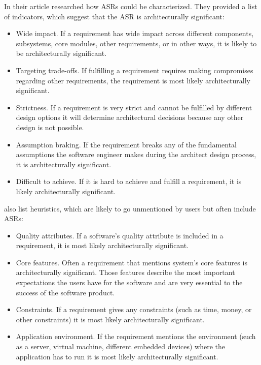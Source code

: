 In their article \textcite{chenCharacterizingArchitecturallySignificant2013} researched how ASRs could be characterized. They provided a list of indicators, which suggest that the ASR is architecturally significant:
\begin{itemize}
	\item Wide impact. If a requirement has wide impact across different components, subsystems, core modules, other requirements, or in other ways, it is likely to be architecturally significant.
	\item Targeting trade-offs. If fulfilling a requirement requires making compromises regarding other requirements, the requirement is most likely architecturally significant.
	\item Strictness. If a requirement is very strict and cannot be fulfilled by different design options it will determine architectural decisions because any other design is not possible.
	\item Assumption braking. If the requirement breaks any of the fundamental assumptions the software engineer makes during the architect design process, it is architecturally significant.
	\item Difficult to achieve. If it is hard to achieve and fulfill a requirement, it is likely architecturally significant.
\end{itemize}

\citeauthor{chenCharacterizingArchitecturallySignificant2013} also list heuristics, which are likely to go unmentioned by users but often include ASRs:

\begin{itemize}
	\item Quality attributes. If a software's quality attribute is included in a requirement, it is most likely architecturally significant.
	\item Core features. Often a requirement that mentions system's core features is architecturally significant. Those features describe the most important expectations the users have for the software and are very essential to the success of the software product.
	\item Constraints. If a requirement gives any constraints (such as time, money, or other constraints) it is most likely architecturally significant.
	\item Application environment. If the requirement mentions the environment (such as a server, virtual machine, different embedded devices) where the application has to run it is most likely architecturally significant.
\end{itemize}

